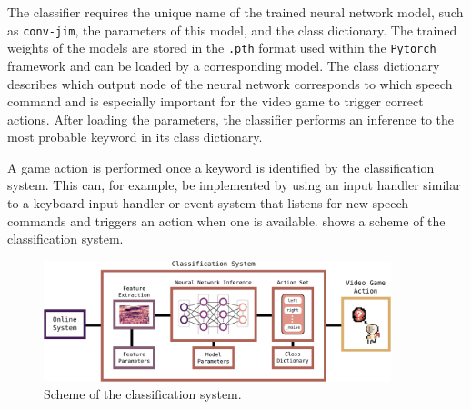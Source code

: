 The classifier requires the unique name of the trained neural network model, such as \texttt{conv-jim}, the parameters of this model, and the class dictionary.
The trained weights of the  models are stored in the \texttt{.pth} format used within the \texttt{Pytorch} framework and can be loaded by a corresponding model.
The class dictionary describes which output node of the neural network corresponds to which speech command and is especially important for the video game to trigger correct actions.
After loading the parameters, the classifier performs an inference to the most probable keyword in its class dictionary.

A game action is performed once a keyword is identified by the classification system.
This can, for example, be implemented by using an input handler similar to a keyboard input handler or event system that listens for new speech commands and triggers an action when one is available.
 shows a scheme of the classification system.
\begin{figure}[!ht]
  \centering
  \includegraphics[width=0.9\textwidth]{./6_game/figs/game_system_classification.pdf}
  \caption{Scheme of the classification system.}
  \label{fig:game_system_classification}
\end{figure}
\FloatBarrier
\noindent

